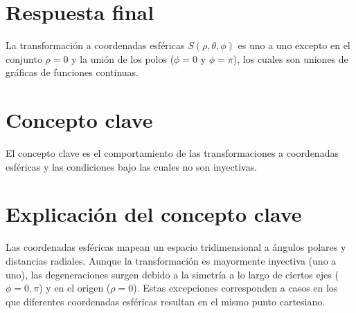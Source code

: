\section*{Respuesta final}

La transformación a coordenadas esféricas \( S(\rho, \theta, \phi) \) es uno a uno excepto en el conjunto \( \rho = 0 \) y la unión de los polos (\( \phi = 0 \) y \( \phi = \pi \)), los cuales son uniones de gráficas de funciones continuas.

\section*{Concepto clave}

El concepto clave es el comportamiento de las transformaciones a coordenadas esféricas y las condiciones bajo las cuales no son inyectivas.

\section*{Explicación del concepto clave}

Las coordenadas esféricas mapean un espacio tridimensional a ángulos polares y distancias radiales. Aunque la transformación es mayormente inyectiva (uno a uno), las degeneraciones surgen debido a la simetría a lo largo de ciertos ejes (\( \phi = 0, \pi \)) y en el origen (\( \rho = 0 \)). Estas excepciones corresponden a casos en los que diferentes coordenadas esféricas resultan en el mismo punto cartesiano.
